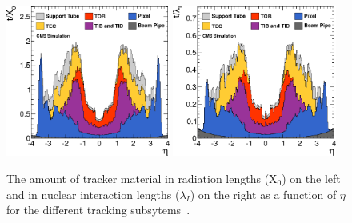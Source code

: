 \begin{figure}
  \includegraphics[width=0.48\textwidth]{cms_experiment/plots/tracker_material.png}
  \includegraphics[width=0.48\textwidth]{cms_experiment/plots/tracker_material_lambda.png}
  \caption[\acs{CMS} tracker material budget]{The amount of \CMS tracker material in radiation lengths (X$_{0}$) on the left and in nuclear interaction lengths ($\lambda_{I}$) on the right as a function of $\eta$ for the different tracking subsytems~\cite{tracker_material}.}
  \label{fig:tracker_material}
\end{figure}

